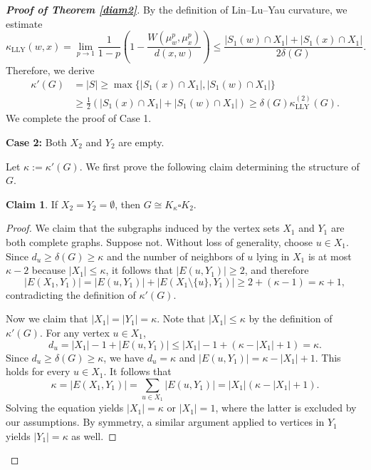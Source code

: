\documentclass[11pt,bezier]{article}
\theoremstyle{definition}
\newtheorem{Claim}{Claim}
\theoremstyle{definition}
\theoremstyle{nonumber}
\begin{document}
\begin{proof}[\bf{Proof of Theorem \ref{diam2}}]
By the definition of Lin--Lu--Yau curvature, we estimate
$$
\kappa_{\mathrm{LLY}}(w, x) = \lim_{p \to 1} \frac{1}{1-p} \left( 1 - \frac{W(\mu_w^p, \mu_x^p)}{d(x, w)} \right) \leq \frac{|S_1(w) \cap X_1| + |S_1(x) \cap X_1|}{2\delta(G)}.
$$
Therefore, we derive
\begin{align*}
\kappa'(G) &= |S| \geq \max\{|S_1(x) \cap X_1|, |S_1(w) \cap X_1|\}\\
&\geq \frac{1}{2} (|S_1(x) \cap X_1| + |S_1(w) \cap X_1|) \geq \delta(G) \kappa_{\mathrm{LLY}}^{(2)}(G).
\end{align*}
We complete the proof of Case 1.

\textbf{Case 2:} Both $X_2$ and $Y_2$ are empty.

Let $\kappa:=\kappa'(G)$. We first prove the following claim determining the structure of $G$.
\begin{Claim}\label{claim1}
If $X_2=Y_2= \emptyset$, then $G\cong K_{\kappa}\square K_2$.
\end{Claim}

\begin{proof}
We claim that the subgraphs induced by the vertex sets $X_1$ and $Y_1$ are both complete graphs.
Suppose not. Without loss of generality, choose $u \in X_1$. Since $d_u\geq\delta(G) \geq \kappa$ and the number of neighbors of $u$ lying in $X_1$ is at most $\kappa-2$ because $|X_1|\leq \kappa$, it follows that $|E(u,Y_1)|\geq2$, and therefore 
$$|E(X_1,Y_1)|=|E(u,Y_1)|+|E(X_1\setminus \{u\},Y_1)|\geq2+(\kappa-1)=\kappa+1,$$
contradicting the definition of $\kappa'(G)$.

Now we claim that $|X_1|=|Y_1|=\kappa$.
Note that $|X_1|\leq \kappa$ by the definition of $\kappa'(G)$. For any vertex $u \in X_1$,
$$
d_u=|X_1|-1+|E(u,Y_1)|\leq |X_1|-1+(\kappa-|X_1|+1)=\kappa.
$$
Since $d_u\geq \delta(G)\geq \kappa$, we have $d_u=\kappa$ and $|E(u,Y_1)|=\kappa-|X_1|+1$. This holds for every $u \in X_1$. It follows that
$$
\kappa=|E(X_1,Y_1)|=\sum_{u\in X_1}|E(u,Y_1)|=|X_1|(\kappa-|X_1|+1).
$$
Solving the equation yields $|X_1|=\kappa$ or $|X_1|=1$, where the latter is excluded by our assumptions. By symmetry, a similar argument applied to vertices in $Y_1$ yields $|Y_1|=\kappa$ as well.


\end{proof}
\end{proof}
\end{document}
